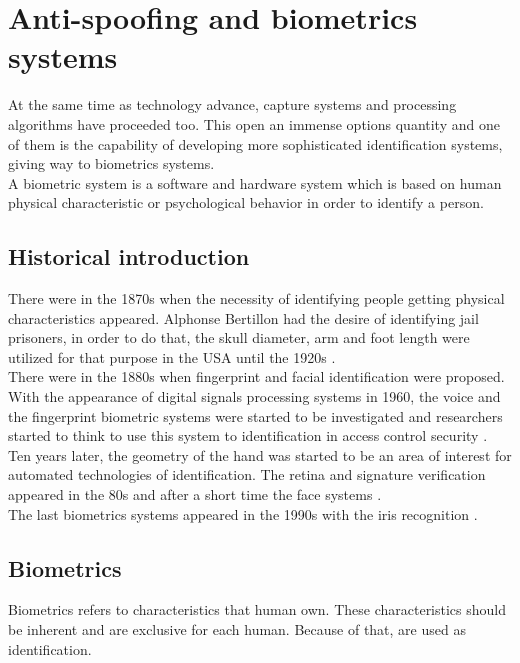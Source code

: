 \section{Anti-spoofing and biometrics systems}
At the same time as technology advance, capture systems and processing algorithms have proceeded too. This open an immense options quantity and one of them is the capability of developing more sophisticated identification systems, giving way to biometrics systems.\\

A biometric system is a software and hardware system which is based on human physical characteristic or psychological behavior in order to identify a person.\\

\subsection{Historical introduction}
There were in the 1870s when the necessity of identifying people getting physical characteristics appeared. Alphonse Bertillon had the desire of identifying jail prisoners, in order to do that, the skull diameter, arm and foot length were utilized for that purpose in the USA until the 1920s \cite{Intro_biometrics}.\\

There were in the 1880s when fingerprint and facial identification were proposed. With the appearance of digital signals processing systems in 1960, the voice and the fingerprint biometric systems were started to be investigated and researchers started to think to use this system to identification in access control security \cite{Intro_biometrics}.\\

Ten years later, the geometry of the hand was started to be an area of interest for automated technologies of identification. The retina and signature verification appeared in the 80s and after a short time the face systems \cite{Intro_biometrics}.\\

The last biometrics systems appeared in the 1990s with the iris recognition \cite{Intro_biometrics}.\\

\subsection{Biometrics}
Biometrics refers to characteristics that human own. These characteristics should be inherent and are exclusive for each human. Because of that, are used as identification.\\

